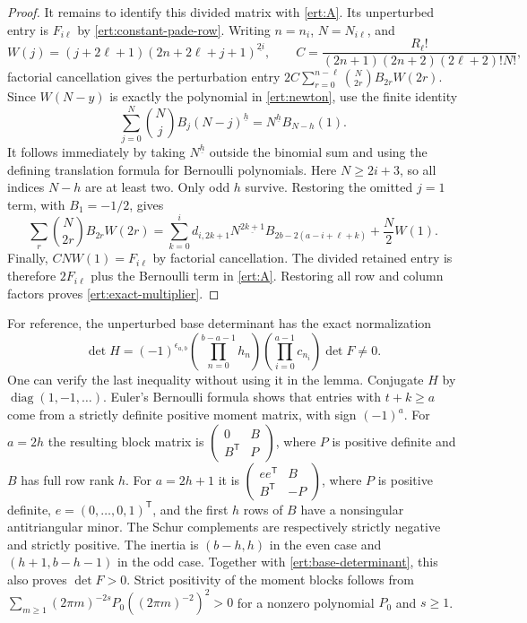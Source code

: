 \begin{proof}
It remains to identify this divided matrix with \eqref{ert:A}.
Its unperturbed entry is $F_{i\ell}$ by
\eqref{ert:constant-pade-row}. Writing $n=n_i$, $N=N_{i\ell}$,
and
\[
 W(j)=(j+2\ell+1)(2n+2\ell+j+1)^{\underline{2i}},\qquad
 C=\frac{R_\ell!}{(2n+1)(2n+2)(2\ell+2)!N!},
\]
factorial cancellation gives the perturbation entry
$2C\sum_{r=0}^{n-\ell}\binom N{2r}B_{2r}W(2r)$.
Since $W(N-y)$ is exactly the polynomial in \eqref{ert:newton},
use the finite identity
\[
 \sum_{j=0}^N\binom Nj B_j(N-j)^{\underline h}
    =N^{\underline h}B_{N-h}(1).
\]
It follows immediately by taking $N^{\underline h}$ outside
the binomial sum and using the defining translation formula for
Bernoulli polynomials. Here $N\ge2i+3$, so all indices $N-h$
are at least two. Only odd $h$ survive. Restoring the omitted
$j=1$ term, with $B_1=-1/2$, gives
\[
 \sum_r\binom N{2r}B_{2r}W(2r)
  =\sum_{k=0}^i d_{i,2k+1}N^{\underline{2k+1}}
           B_{2b-2(a-i+\ell+k)}+\frac N2W(1).
\]
Finally, $CNW(1)=F_{i\ell}$ by factorial cancellation. The divided
retained entry is therefore $2F_{i\ell}$ plus the Bernoulli term
in \eqref{ert:A}. Restoring all row and column factors proves
\eqref{ert:exact-multiplier}.
\end{proof}

For reference, the unperturbed base determinant has the exact
normalization
\begin{equation}\label{ert:base-determinant}
 \det H=(-1)^{\epsilon_{a,b}}
 \left(\prod_{n=0}^{b-a-1}h_n\right)
 \left(\prod_{i=0}^{a-1}c_{n_i}\right)\det F\ne0.
\end{equation}
One can verify the last inequality without using it in the lemma.
Conjugate $H$ by $\operatorname{diag}(1,-1,\ldots)$.
Euler's Bernoulli formula shows that entries with $t+k\ge a$
come from a strictly definite positive moment matrix,
with sign $(-1)^a$. For $a=2h$ the resulting block matrix is
$\left(\begin{smallmatrix}0&B\\B^{\mathsf T}&P\end{smallmatrix}\right)$,
where $P$ is positive definite and $B$ has full row rank $h$.
For $a=2h+1$ it is
$\left(\begin{smallmatrix}ee^{\mathsf T}&B\\B^{\mathsf T}&-P\end{smallmatrix}\right)$,
where $P$ is positive definite, $e=(0,\ldots,0,1)^{\mathsf T}$,
and the first $h$ rows of $B$ have a nonsingular antitriangular
minor. The Schur complements are respectively strictly negative
and strictly positive. The inertia is $(b-h,h)$ in the even case
and $(h+1,b-h-1)$ in the odd case. Together with
\eqref{ert:base-determinant}, this also proves $\det F>0$.
Strict positivity of the moment blocks follows from
$\sum_{m\ge1}(2\pi m)^{-2s}P_0((2\pi m)^{-2})^2>0$ for a
nonzero polynomial $P_0$ and $s\ge1$.

